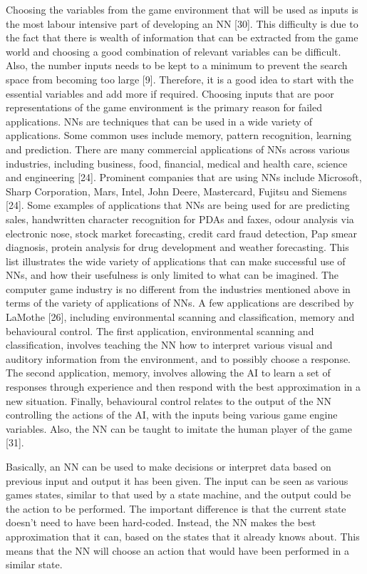 \documentclass[a4paper,oneside]{report}
\begin{document}
Choosing the variables from the game environment that will be used as inputs is the most labour intensive part of developing an NN [30]. This difficulty is due to the fact that there is wealth of information that can be extracted from the game world and choosing a good combination of relevant variables can be difficult. Also, the number inputs needs to be kept to a minimum to prevent the search space from becoming too large [9]. Therefore, it is a good idea to start with the essential variables and add more if required. Choosing inputs that are poor representations of the game environment is the primary reason for failed applications.
NNs are techniques that can be used in a wide variety of applications. Some common uses include memory, pattern recognition, learning and prediction. There are many commercial applications of NNs across various industries, including business, food, financial, medical and health care, science and engineering [24]. Prominent companies that are using NNs include Microsoft, Sharp Corporation, Mars, Intel, John Deere, Mastercard, Fujitsu and Siemens [24]. Some examples of applications that NNs are being used for are predicting sales, handwritten character recognition for PDAs and faxes, odour analysis via electronic nose, stock market forecasting, credit card fraud detection, Pap smear diagnosis, protein analysis for drug development and weather forecasting. This list illustrates the wide variety of applications that can make successful use of NNs, and how their usefulness is only limited to what can be imagined.
The computer game industry is no different from the industries mentioned above in terms of the variety of applications of NNs. A few applications are described by LaMothe [26], including environmental scanning and classification, memory and behavioural control. The first application, environmental scanning and classification, involves teaching the NN how to interpret various visual and auditory information from the environment, and to possibly choose a response. The second application, memory, involves allowing the AI to learn a set of responses through experience and then respond with the best approximation in a new situation. Finally, behavioural control relates to the output of the NN controlling the actions of the AI, with the inputs being various game engine variables. Also, the NN can be taught to imitate the human player of the game [31].

Basically, an NN can be used to make decisions or interpret data based on previous input and output it has been given. The input can be seen as various games states, similar to that used by a state machine, and the output could be the action to be performed. The important difference is that the current state doesn’t need to have been hard-coded. Instead, the NN makes the best approximation that it can, based on the states that it already knows about. This means that the NN will choose an action that would have been performed in a similar state.
\end{document}

